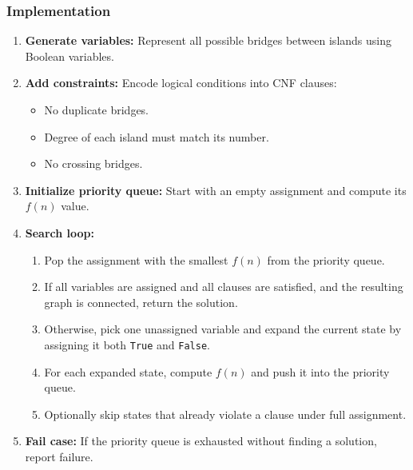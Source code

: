 \subsubsection{Implementation}

\begin{enumerate}
  \item \textbf{Generate variables:} Represent all possible bridges between islands using Boolean variables.

  \item \textbf{Add constraints:} Encode logical conditions into CNF clauses:
  \begin{itemize}
    \item No duplicate bridges.
    \item Degree of each island must match its number.
    \item No crossing bridges.
  \end{itemize}

  \item \textbf{Initialize priority queue:} Start with an empty assignment and compute its $f(n)$ value.

  \item \textbf{Search loop:}
  \begin{enumerate}
    \item Pop the assignment with the smallest $f(n)$ from the priority queue.
    \item If all variables are assigned and all clauses are satisfied, and the resulting graph is connected, return the solution.
    \item Otherwise, pick one unassigned variable and expand the current state by assigning it both \texttt{True} and \texttt{False}.
    \item For each expanded state, compute $f(n)$ and push it into the priority queue.
    \item Optionally skip states that already violate a clause under full assignment.
  \end{enumerate}

  \item \textbf{Fail case:} If the priority queue is exhausted without finding a solution, report failure.
\end{enumerate}
